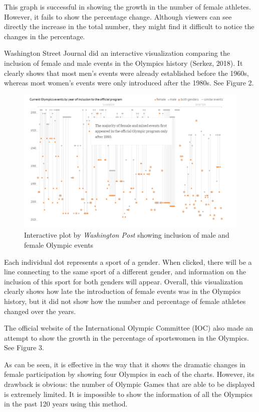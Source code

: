 \documentclass[12pt]{article}
\begin{document}
This graph is successful in showing the growth in the number of female athletes. However, it fails to show the percentage change. Although viewers can see directly the increase in the total number, they might find it difficult to notice the changes in the percentage. 

Washington Street Journal did an interactive visualization comparing the inclusion of female and male events in the Olympics history (Serkez, 2018). It clearly shows that most men’s events were already established before the 1960s, whereas most women’s events were only introduced after the 1980s. See Figure 2. 

\begin{figure}[!b]
    \centering
    \includegraphics[scale=0.3]{pics/1-4.png}
    \caption{Interactive plot by \textit{Washington Post} showing inclusion of male and female Olympic events}
    \label{fig:my_label}
\end{figure}
\FloatBarrier %

Each individual dot represents a sport of a gender. When clicked, there will be a line connecting to the same sport of a different gender, and information on the inclusion of this sport for both genders will appear. Overall, this visualization clearly shows how late the introduction of female events was in the Olympics history, but it did not show how the number and percentage of female athletes changed over the years. 

The official website of the International Olympic Committee (IOC) also made an attempt to show the growth in the percentage of sportswomen in the Olympics. See Figure 3.

As can be seen, it is effective in the way that it shows the dramatic changes in female participation by showing four Olympics in each of the charts. However, its drawback is obvious: the number of Olympic Games that are able to be displayed is extremely limited. It is impossible to show the information of all the Olympics in the past 120 years using this method. 
\end{document}

